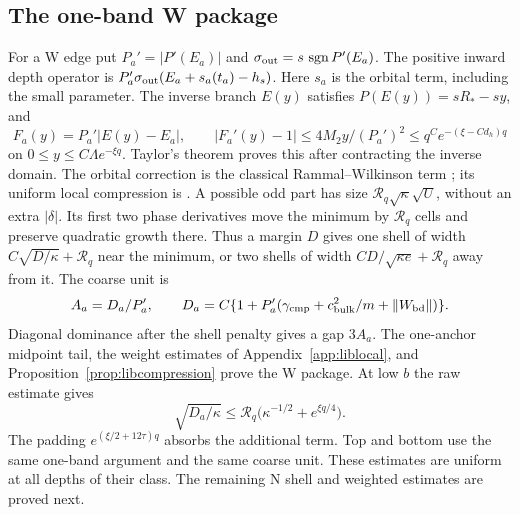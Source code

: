 \subsection{The one-band W package}

For a W edge put $P_a'=|P'(E_a)|$ and
$\sigma_{\rm out}=s\,\operatorname{sgn}P'(E_a)$.
The positive inward depth operator is
$P_a'\sigma_{\rm out}(E_a+s_a(t_a)-h_s)$.
Here $s_a$ is the orbital term, including the small parameter.
The inverse branch $E(y)$ satisfies $P(E(y))=sR_*-sy$, and
\[
 F_a(y)=P_a'|E(y)-E_a|,\qquad
 |F_a'(y)-1|\le4M_2y/(P_a')^2
       \le q^C e^{-(\xi-Cd_h)q}
\]
on $0\le y\le C\Lambda e^{-\xi q}$.
Taylor's theorem proves this after contracting the inverse domain.
The orbital correction is the classical Rammal--Wilkinson term
\cite{Wilkinson1987,RammalBellissard,HSII}; its uniform local compression is
\cite[Appendix C]{DMband}.
A possible odd part has size
$\mathcal R_q\sqrt\kappa\sqrt U$, without an extra $|\delta|$.
Its first two phase derivatives move the minimum by
$\mathcal R_q$ cells and preserve quadratic growth there.
Thus a margin $D$ gives one shell of width
$C\sqrt{D/\kappa}+\mathcal R_q$ near the minimum, or two shells of
width $CD/\sqrt{\kappa e}+\mathcal R_q$ away from it.
The coarse unit is
\[
 A_a=D_a/P_a',\qquad
 D_a=C\{1+P_a'(\gamma_{\rm cmp}+c_{\rm bulk}^2/m
                                      +\|W_{\rm bd}\|)\}.
\]
Diagonal dominance after the shell penalty gives a gap $3A_a$.
The one-anchor midpoint tail, the weight estimates of
Appendix~\ref{app:liblocal}, and Proposition~\ref{prop:libcompression}
prove the W package. At low $b$ the raw estimate gives
\[
 \sqrt{D_a/\kappa}\le
 \mathcal R_q\bigl(\kappa^{-1/2}+e^{\xi q/4}\bigr).
\]
The padding $e^{(\xi/2+12\tau)q}$ absorbs the additional term.
Top and bottom use the same one-band argument and the same coarse
unit. These estimates are uniform at all depths of their class.
The remaining N shell and weighted estimates are proved next.
